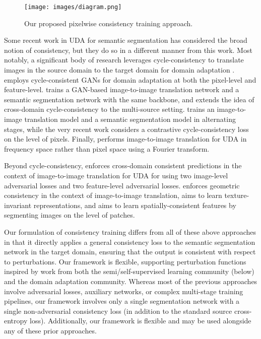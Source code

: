 \documentclass[final]{cvpr}
\begin{document}
\begin{figure}
  \texttt{[image: images/diagram.png]}
  \caption{Our proposed pixelwise consistency training approach.}
  \label{fig:diagram}
\end{figure}


Some recent work in UDA for semantic segmentation has considered the broad notion of consistency, but they do so in a different manner from this work. Most notably, a significant body of research leverages cycle-consistency to translate images in the source domain to the target domain for domain adaptation \cite{cycada,chen2019crdoco,fu2019geometry,Li_2019_CVPR,zhao2019multi,murez2018image}. \cite{cycada} employs cycle-consistent GANs for domain adaptation at both the pixel-level and feature-level. \cite{murez2018image} trains a GAN-based image-to-image translation network and a semantic segmentation network with the same backbone, and \cite{Li_2019_CVPR} extends the idea of cross-domain cycle-consistency to the multi-source setting. \cite{li2019bidirectional} trains an image-to-image translation model and a semantic segmentation model in alternating stages, while the very recent work \cite{kang2020pixel} considers a contrastive cycle-consistency loss on the level of pixels. Finally, \cite{yang2020fda} performs image-to-image translation for UDA in frequency space rather than pixel space using a Fourier transform.

Beyond cycle-consistency, \cite{chen2019crdoco} enforces cross-domain consistent predictions in the context of image-to-image translation for UDA for using two image-level adversarial losses and two feature-level adversarial losses. 
\cite{fu2019geometry} enforces geometric consistency in the context of image-to-image translation, \cite{kim2020learning} aims to learn texture-invariant representations, and \cite{iqbal2020mlsl} aims to learn spatially-consistent features by segmenting images on the level of patches. 

Our formulation of consistency training differs from all of these above approaches in that it directly applies a general consistency loss to the semantic segmentation network in the target domain, ensuring that the output is consistent with respect to perturbations. Our framework is flexible, supporting perturbation functions inspired by work from both the semi/self-supervised learning community (below) and the domain adaptation community. Whereas most of the previous approaches involve adversarial losses, auxiliary networks, or complex multi-stage training pipelines, our framework involves only a single segmentation network with a single non-adversarial consistency loss (in addition to the standard source cross-entropy loss). Additionally, our framework is flexible and may be used alongside any of these prior approaches. 
\end{document}
